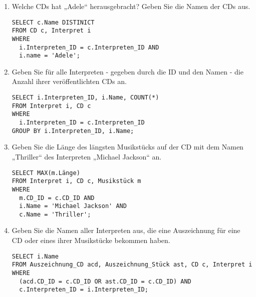 \documentclass{lehramt-informatik-aufgabe}
\begin{document}
\begin{enumerate}


\item Welche CDs hat „Adele“ herausgebracht? Geben Sie die Namen der CDs
aus.

\begin{liAntwort}
\begin{verbatim}
SELECT c.Name DISTINICT
FROM CD c, Interpret i
WHERE
  i.Interpreten_ID = c.Interpreten_ID AND
  i.name = 'Adele';
\end{verbatim}
\end{liAntwort}


\item Geben Sie für alle Interpreten - gegeben durch die ID und den
Namen - die Anzahl ihrer veröffentlichten CDs an.

\begin{liAntwort}
\begin{verbatim}
SELECT i.Interpreten_ID, i.Name, COUNT(*)
FROM Interpret i, CD c
WHERE
  i.Interpreten_ID = c.Interpreten_ID
GROUP BY i.Interpreten_ID, i.Name;
\end{verbatim}
\end{liAntwort}


\item Geben Sie die Länge des längsten Musikstücks auf der CD mit dem
Namen „Thriller“ des Interpreten „Michael Jackson“ an.

\begin{liAntwort}
\begin{verbatim}
SELECT MAX(m.Länge)
FROM Interpret i, CD c, Musikstück m
WHERE
  m.CD_ID = c.CD_ID AND
  i.Name = 'Michael Jackson' AND
  c.Name = 'Thriller';
\end{verbatim}
\end{liAntwort}


\item Geben Sie die Namen aller Interpreten aus, die eine Auszeichnung
für eine CD oder eines ihrer Musikstücke bekommen haben.

\begin{liAntwort}
\begin{verbatim}
SELECT i.Name
FROM Auszeichnung_CD acd, Auszeichnung_Stück ast, CD c, Interpret i
WHERE
  (acd.CD_ID = c.CD_ID OR ast.CD_ID = c.CD_ID) AND
  c.Interpreten_ID = i.Interpreten_ID;
\end{verbatim}
\end{liAntwort}


\end{enumerate}
\end{document}
